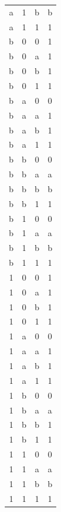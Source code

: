 \documentclass[11pt]{article}
\begin{document}
\begin{table}[ht]
\begin{minipage}{0.3\textwidth}
{\begin{tabular}{cccc}
a & 1 & b & b \\
a & 1 & 1 & 1 \\
b & 0 & 0 & 1 \\
b & 0 & a & 1 \\
b & 0 & b & 1 \\
b & 0 & 1 & 1 \\
b & a & 0 & 0 \\
b & a & a & 1 \\
b & a & b & 1 \\
b & a & 1 & 1 \\
b & b & 0 & 0 \\
b & b & a & a \\
b & b & b & b \\
b & b & 1 & 1 \\
b & 1 & 0 & 0 \\
b & 1 & a & a \\
b & 1 & b & b \\
b & 1 & 1 & 1 \\
1 & 0 & 0 & 1 \\
1 & 0 & a & 1 \\
1 & 0 & b & 1 \\
1 & 0 & 1 & 1 \\
1 & a & 0 & 0 \\
1 & a & a & 1 \\
1 & a & b & 1 \\
1 & a & 1 & 1 \\
1 & b & 0 & 0 \\
1 & b & a & a \\
1 & b & b & 1 \\
1 & b & 1 & 1 \\
1 & 1 & 0 & 0 \\
1 & 1 & a & a \\
1 & 1 & b & b \\
1 & 1 & 1 & 1 \\
\hline
\end{tabular}%
}
\end{minipage}
\hfill
\begin{minipage}{0.3\textwidth}
\centering
{}
\end{minipage}
\end{table}
\end{document}
